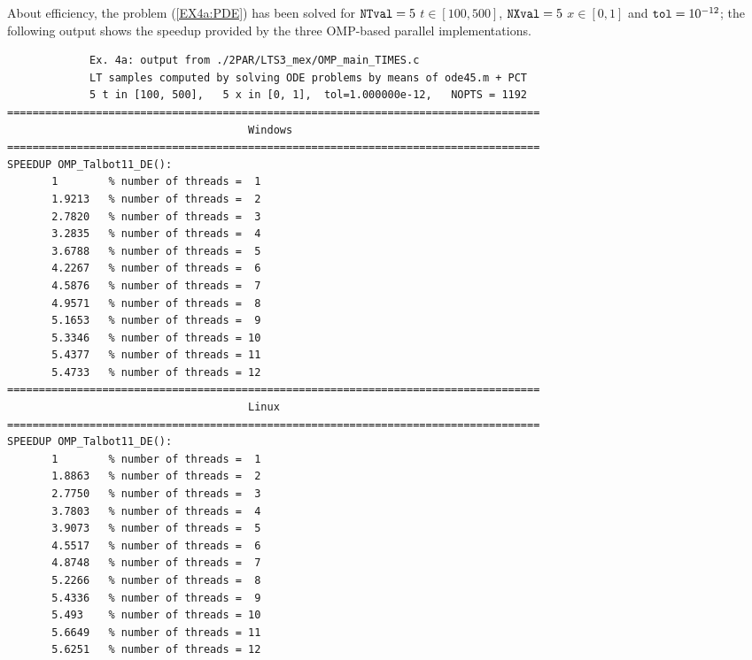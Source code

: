 \documentclass[a4paper,10pt]{report}%
\begin{document}
About efficiency, the problem (\ref{EX4a:PDE}) has been solved for ${\tt NTval}=5$ $t\in[100, 500]$,
${\tt NXval}=5$ $x\in[0,1]$ and ${\tt tol}=10^{-12}$; the following output shows the speedup provided
by the three OMP-based parallel implementations.
\begin{lstlisting}
             Ex. 4a: output from ./2PAR/LTS3_mex/OMP_main_TIMES.c
             LT samples computed by solving ODE problems by means of ode45.m + PCT
             5 t in [100, 500],   5 x in [0, 1],  tol=1.000000e-12,   NOPTS = 1192
====================================================================================
                                      Windows
====================================================================================
SPEEDUP OMP_Talbot11_DE():
       1        % number of threads =  1
       1.9213   % number of threads =  2
       2.7820   % number of threads =  3
       3.2835   % number of threads =  4
       3.6788   % number of threads =  5
       4.2267   % number of threads =  6
       4.5876   % number of threads =  7
       4.9571   % number of threads =  8
       5.1653   % number of threads =  9
       5.3346   % number of threads = 10
       5.4377   % number of threads = 11
       5.4733   % number of threads = 12
====================================================================================
                                      Linux
====================================================================================
SPEEDUP OMP_Talbot11_DE():
       1        % number of threads =  1
       1.8863   % number of threads =  2
       2.7750   % number of threads =  3
       3.7803   % number of threads =  4
       3.9073   % number of threads =  5
       4.5517   % number of threads =  6
       4.8748   % number of threads =  7
       5.2266   % number of threads =  8
       5.4336   % number of threads =  9
       5.493    % number of threads = 10
       5.6649   % number of threads = 11
       5.6251   % number of threads = 12


\end{lstlisting}
\end{document}
